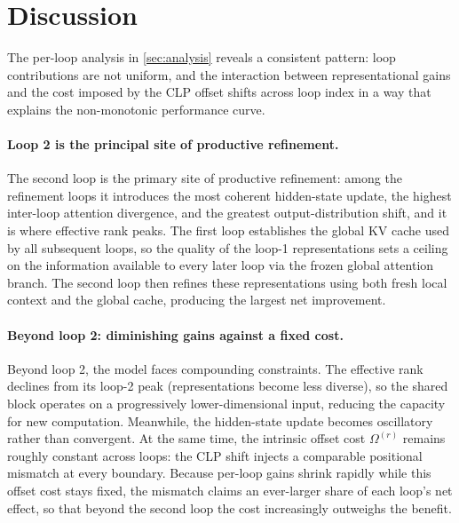 \section{Discussion}
\label{sec:optimize_loop_strategy}

The per-loop analysis in \autoref{sec:analysis} reveals a consistent
pattern: loop contributions are not uniform, and the interaction between
representational gains and the cost imposed by the CLP offset shifts across
loop index in a way that explains the non-monotonic performance curve.

\paragraph{Loop 2 is the principal site of productive refinement.}
The second loop is the primary site of productive refinement: among the
refinement loops it introduces the most coherent hidden-state update, the
highest inter-loop attention divergence, and the greatest output-distribution
shift, and it is where effective rank peaks.
The first loop establishes the global KV cache used by all subsequent loops,
so the quality of the loop-1 representations sets a ceiling on the
information available to every later loop via the frozen global attention
branch.
The second loop then refines these representations using both fresh local
context and the global cache, producing the largest net improvement.

\paragraph{Beyond loop 2: diminishing gains against a fixed cost.}
Beyond loop 2, the model faces compounding constraints.
The effective rank declines from its loop-2 peak (representations become less
diverse), so the shared block operates on a progressively lower-dimensional
input, reducing the capacity for new computation. Meanwhile, the hidden-state
update becomes oscillatory rather than convergent.
At the same time, the intrinsic offset cost $\Omega^{(r)}$ remains roughly
constant across loops: the CLP shift injects a comparable positional mismatch
at every boundary.
Because per-loop gains shrink rapidly while this offset cost stays fixed, the
mismatch claims an ever-larger share of each loop's net effect, so that beyond
the second loop the cost increasingly outweighs the benefit.

